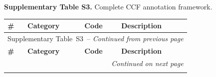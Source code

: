 \documentclass[12pt]{article}
\makeatletter
\let\CCFlandscape@orig\landscape
\renewcommand{\landscape}{%
  \CCFlandscape@orig
  \setlength{\textwidth}{\dimexpr\paperheight-5cm\relax}%
  \setlength{\linewidth}{\textwidth}%
  \setlength{\hsize}{\textwidth}%
  \setlength{\columnwidth}{\textwidth}%
}
\renewcommand\_{\texttt{\detokenize{_}\allowbreak}}
\makeatother
\begin{document}
\landscape
\noindent\textbf{Supplementary Table S3.} Complete CCF annotation framework.
\vspace{0.5em}
{\footnotesize
{}
{}
\label{tab:complete_framework}
\begin{longtable}{p{0.5cm}p{4.5cm}p{2.8cm}p{13.5cm}}
\toprule
\textbf{\#} & \textbf{Category} & \textbf{Code} & \textbf{Description} \\
\midrule
\endfirsthead
\multicolumn{4}{c}{Supplementary Table~S3\ -- \textit{Continued from previous page}} \\
\toprule
\textbf{\#} & \textbf{Category} & \textbf{Code} & \textbf{Description} \\
\midrule
\endhead
\midrule
\multicolumn{4}{r}{\textit{Continued on next page}} \\
\endfoot
\bottomrule
\endlastfoot


\end{longtable}}
\end{document}

